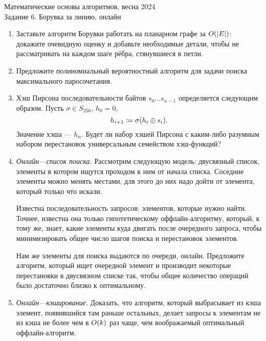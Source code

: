 \documentclass[a4paper,11pt]{article}
\begin{document}
\begin{center}
	\Large Математические основы алгоритмов, весна 2024 \\
	\Large Задание 6. Борувка за линию, онлайн
\end{center}

\begin{enumerate}

	\item Заставьте алгоритм Борувки работать на планарном графе за \(O \lr*{|E|}\): докажите очевидную оценку и добавьте необходимые детали, чтобы не рассматривать на каждом шаге рёбра, стянувшиеся в петли.

	\item Предложите полиномиальный вероятностный алгоритм для задачи поиска максимального паросочетания.

	\item Хэш Пирсона последовательности байтов \(s_0 \ldots s_{n-1}\) определяется следующим образом. Пусть \(\sigma \in S_{256}\), \(h_0 = 0\), \[h_{i+1} \coloneqq \sigma\lr*{h_i \oplus s_i}.\] Значение хэша — \(h_n\). Будет ли набор хэшей Пирсона с каким-либо разумным набором перестановок универсальным семейством хэш-функций?
	
	\item {\it Онлайн—список поиска.} Рассмотрим следующую модель: двусвязный список, элементы в котором ищутся проходом к ним от начала списка. Соседние элементы можно менять местами, для этого до них надо дойти от элемента, который только что искали.

	Известна последовательность запросов: элементов, которые нужно найти. Точнее, известна она только гипотетическому оффлайн-алгоритму, который, к тому же, знает, какие элементы куда двигать после очередного запроса, чтобы минимизировать общее число шагов поиска и перестановок элементов.

	Нам же элементы для поиска выдаются по очереди, онлайн. Предложите алгоритм, который ищет очередной элемент и производит некоторые перестановки в двусвязном списке так, чтобы общее количество операций было достаточно близко к оптимальному.

	\item {\it Онлайн—кэширование.} Доказать, что алгоритм, который выбрасывает из кэша элемент, появившийся там раньше остальных, делает запросы к элементам не из кэша не более чем в \(O\lr*{k}\) раз чаще, чем воображаемый оптимальный оффлайн-алгоритм.

\end{enumerate}
\end{document}
